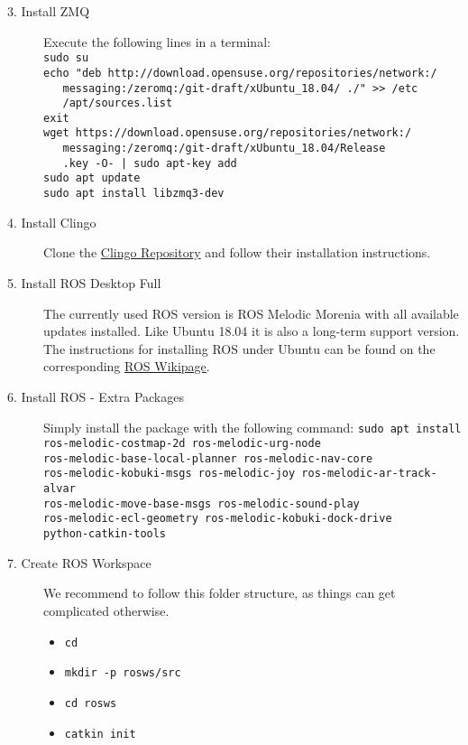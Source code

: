 \begin{description}
	\item[3. Install ZMQ] Execute the following lines in a terminal:\\
\verb#sudo su#\\
\verb#echo "deb http://download.opensuse.org/repositories/network:/#\\\verb#   messaging:/zeromq:/git-draft/xUbuntu_18.04/ ./" >> /etc#\\\verb#   /apt/sources.list#\\
\verb#exit#\\
\verb#wget https://download.opensuse.org/repositories/network:/#\\\verb#   messaging:/zeromq:/git-draft/xUbuntu_18.04/Release#\\\verb#   .key -O- | sudo apt-key add#\\
\verb#sudo apt update#\\
\verb#sudo apt install libzmq3-dev#
	\item[4. Install Clingo] Clone the \href{https://github.com/potassco/clingo}{Clingo Repository} and follow their installation instructions.
	\item[5. Install ROS Desktop Full] The currently used ROS version is ROS Melodic Morenia with all available updates installed. Like Ubuntu 18.04 it is also a long-term support version. The instructions for installing ROS under Ubuntu can be found on the corresponding \href{http://wiki.ros.org/melodic/Installation/Ubuntu}{ROS Wikipage}.
	\item[6. Install ROS - Extra Packages] Simply install the package with the following command: \verb#sudo apt install ros-melodic-costmap-2d ros-melodic-urg-node #\\\verb#ros-melodic-base-local-planner ros-melodic-nav-core#\\\verb#ros-melodic-kobuki-msgs ros-melodic-joy ros-melodic-ar-track-alvar#\\\verb#ros-melodic-move-base-msgs ros-melodic-sound-play#\\\verb#ros-melodic-ecl-geometry ros-melodic-kobuki-dock-drive#\\\verb#python-catkin-tools#
	\item[7. Create ROS Workspace] We recommend to follow this folder structure, as things can get complicated otherwise. 
	\begin{itemize}
		\item \verb#cd#
		\item \verb#mkdir -p rosws/src#
		\item \verb#cd rosws#
		\item \verb#catkin init#

\end{itemize}
\end{description}
